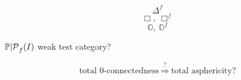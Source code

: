\[
\Delta^f
\]
\[
\Box,\ \Box^f
\]
\[
\mathbb O,\ \mathbb O^f
\]

${\mathbb P|\mathcal P}_f(I)$ weak test category?



\[
\text{total 0-connectedness}\ \overset{?}{\Longrightarrow}\
\text{total asphericity?}
\]

